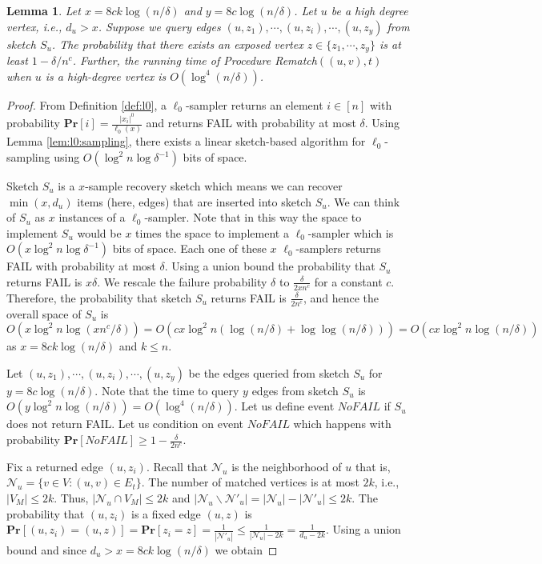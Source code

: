 \documentclass[11pt,letter]{article}
\newtheorem{lemma}[theorem]{Lemma}
\renewcommand{\Pr}[1]{\ensuremath{\mathbf{Pr}[#1]}}
\begin{document}
\begin{lemma}
\label{lem:high:rematch}
Let $x=8ck\log(n/\delta)$ and $y=8c\log(n/\delta)$.
Let $u$ be a high degree vertex, i.e., $d_u> x$.
Suppose we query edges $(u,z_1),\cdots,(u,z_i),\cdots, (u,z_y)$ from sketch $S_u$.
The probability that there exists an exposed vertex $z\in \{z_1,\cdots,z_y\}$ is
at least $1-\delta/n^c$.
Further, the running time of Procedure {\sf Rematch$((u,v), t)$}
when $u$ is a high-degree vertex is $O(\log^4(n/\delta))$.
\end{lemma}

\begin{proof}
From Definition \ref{def:l0}, a $\ell_0$-sampler returns an element $i\in [n]$
with probability $\Pr{i}= \frac{|x_i|^0}{\ell_0(x)}$ and returns FAIL with
probability at most $\delta$. Using Lemma \ref{lem:l0:sampling}, there exists
a linear sketch-based algorithm for $\ell_0$-sampling using
$O(\log^2 n\log\delta^{-1})$ bits of space.

Sketch $S_u$ is a $x$-sample recovery sketch which means
we can recover $\min(x,d_u)$ items (here, edges) that are
inserted into sketch $S_u$.
We can think of $S_u$ as $x$ instances of a $\ell_0$-sampler.
Note that in this way the space
to implement $S_u$ would be $x$ times the space to implement a $\ell_0$-sampler
which is $O(x\log^2 n\log\delta^{-1})$ bits of space.
Each one of these $x$ $\ell_0$-samplers
returns FAIL with probability at most $\delta$.
Using a union bound the probability that $S_u$ returns FAIL is
$x\delta$.
We rescale the failure probability $\delta$ to $\frac{\delta}{2xn^c}$
for a constant $c$.
Therefore, the probability that sketch $S_u$ returns FAIL is
$\frac{\delta}{2n^c}$, and hence the overall space of $S_u$ is
$O(x\log^2 n\log(xn^c/\delta))=O(cx\log^2 n(\log(n/\delta)+\log\log(n/\delta)))=O(cx\log^2 n\log(n/\delta))$
as $x=8ck\log(n/\delta)$ and $k\le n$.

Let $(u,z_1),\cdots,(u,z_i),\cdots, (u,z_y)$ be the edges queried from sketch $S_u$ for $y=8c\log(n/\delta)$.
Note that the time to query $y$ edges from sketch $S_u$ is
$O(y\log^2 n\log(n/\delta))=O(\log^4(n/\delta))$.
Let us define event $NoFAIL$ if $S_u$ does not return FAIL.
Let us condition on event $NoFAIL$ which happens with probability
$\Pr{NoFAIL}\ge 1-\frac{\delta}{2n^c}$.

Fix a returned edge $(u,z_i)$.
Recall that $\mathcal{N}_u$ is the neighborhood
of $u$ that is, $\mathcal{N}_u=\{v\in V: (u,v)\in E_t\}$.
The number of matched vertices is at most $2k$,
i.e., $|V_M|\le 2k$. Thus, $|\mathcal{N}_u \cap V_M|\le 2k$ and
$|\mathcal{N}_u \backslash \mathcal{N}'_u|=|\mathcal{N}_u| - |\mathcal{N}'_u|\le 2k$.
The probability that $(u,z_i)$ is a fixed edge $(u,z)$ is
$\Pr{(u,z_i)=(u,z)}=\Pr{z_i=z}=\frac{1}{|\mathcal{N}'_u|}\le\frac{1}{|\mathcal{N}_u|-2k}=\frac{1}{d_u-2k}$.
Using a union bound and since $d_u>x=8ck\log(n/\delta)$ we obtain


\end{proof}
\end{document}
